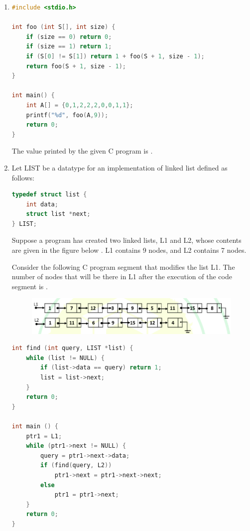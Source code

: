\documentclass[a4paper, 11pt]{article}
\begin{document}
\begin{enumerate}
    \hfill{}

    \item
    \begin{lstlisting}[language=C]
#include <stdio.h>

int foo (int S[], int size) {
    if (size == 0) return 0;
    if (size == 1) return 1;
    if (S[0] != S[1]) return 1 + foo(S + 1, size - 1);
    return foo(S + 1, size - 1);
}

int main() {
    int A[] = {0,1,2,2,2,0,0,1,1};
    printf("%d", foo(A,9));
    return 0;
}
    \end{lstlisting}
    The value printed by the given C program is \underline{\hspace{2cm}}. 

    \hfill{}

    \item Let LIST be a datatype for an implementation of linked list defined as follows:
    \begin{lstlisting}[language=C]
typedef struct list {
    int data;
    struct list *next;
} LIST;
    \end{lstlisting}
    Suppose a program has created two linked lists, L1 and L2, whose contents are given in the figure below . L1 contains 9 nodes, and L2 contains 7 nodes.
    
    Consider the following C program segment that modifies the list L1. The number of nodes that will be there in L1 after the execution of the code segment is \underline{\hspace{2cm}}. 
    
    \begin{figure}[H]
        \centering
        \includegraphics[width=\columnwidth]{figs/q62.png}
    \end{figure}
    
    \begin{lstlisting}[language=C]
int find (int query, LIST *list) {
    while (list != NULL) {
        if (list->data == query) return 1;
        list = list->next;
    }
    return 0;
}

int main () {
    ptr1 = L1;
    while (ptr1->next != NULL) {
        query = ptr1->next->data;
        if (find(query, L2))
            ptr1->next = ptr1->next->next;
        else
            ptr1 = ptr1->next;
    }
    return 0;
}
    \end{lstlisting}


\end{enumerate}
\end{document}
